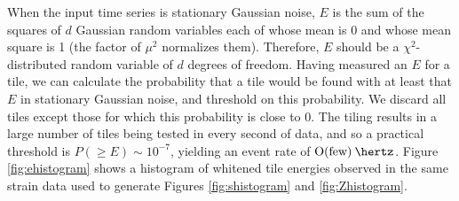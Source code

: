 \documentclass{article}
\begin{document}
When the input time series is stationary Gaussian noise, \(E\) is the sum
of the squares of \(d\) Gaussian random variables each of whose mean is 0
and whose mean square is 1 (the factor of \(\mu^{2}\) normalizes them).
Therefore, \(E\) should be a \(\chi^{2}\)-distributed random variable of
\(d\) degrees of freedom.  Having measured an \(E\) for a tile, we can
calculate the probability that a tile would be found with at least that
\(E\) in stationary Gaussian noise, and threshold on this probability.  We
discard all tiles except those for which this probability is close to 0.
The tiling results in a large number of tiles being tested in every second
of data, and so a practical threshold is \(P(\geq E) \sim 10^{-7}\),
yielding an event rate of \(\unit{\order(\text{few})}{\hertz}\).  Figure
\ref{fig:ehistogram} shows a histogram of whitened tile energies observed
in the same strain data used to generate Figures \ref{fig:shistogram} and
\ref{fig:Zhistogram}.
\end{document}
